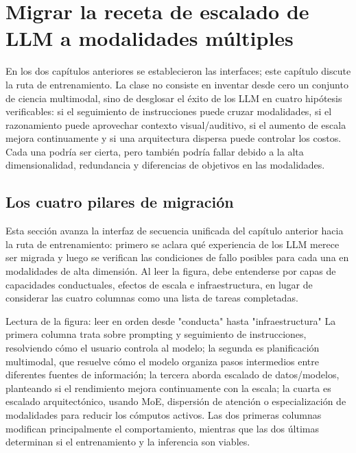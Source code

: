 \section{Migrar la receta de escalado de LLM a modalidades múltiples}

En los dos capítulos anteriores se establecieron las interfaces; este capítulo discute la ruta de entrenamiento. La clase no consiste en inventar desde cero un conjunto de ciencia multimodal, sino de desglosar el éxito de los LLM en cuatro hipótesis verificables: si el seguimiento de instrucciones puede cruzar modalidades, si el razonamiento puede aprovechar contexto visual/auditivo, si el aumento de escala mejora continuamente y si una arquitectura dispersa puede controlar los costos. Cada una podría ser cierta, pero también podría fallar debido a la alta dimensionalidad, redundancia y diferencias de objetivos en las modalidades.

\subsection{Los cuatro pilares de migración}

Esta sección avanza la interfaz de secuencia unificada del capítulo anterior hacia la ruta de entrenamiento: primero se aclara qué experiencia de los LLM merece ser migrada y luego se verifican las condiciones de fallo posibles para cada una en modalidades de alta dimensión. Al leer la figura, debe entenderse por capas de capacidades conductuales, efectos de escala e infraestructura, en lugar de considerar las cuatro columnas como una lista de tareas completadas.


\begin{knowledgebox}{Lectura de la figura: leer en orden desde "conducta" hasta "infraestructura"}
La primera columna trata sobre prompting y seguimiento de instrucciones, resolviendo cómo el usuario controla al modelo; la segunda es planificación multimodal, que resuelve cómo el modelo organiza pasos intermedios entre diferentes fuentes de información; la tercera aborda escalado de datos/modelos, planteando si el rendimiento mejora continuamente con la escala; la cuarta es escalado arquitectónico, usando MoE, dispersión de atención o especialización de modalidades para reducir los cómputos activos. Las dos primeras columnas modifican principalmente el comportamiento, mientras que las dos últimas determinan si el entrenamiento y la inferencia son viables.
\end{knowledgebox}

